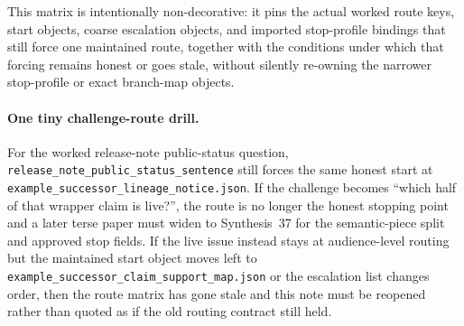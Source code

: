 \documentclass[11pt]{article}
\begin{document}
This matrix is intentionally non-decorative: it pins the actual worked route keys, start objects, coarse escalation objects, and imported stop-profile bindings that still force one maintained route, together with the conditions under which that forcing remains honest or goes stale, without silently re-owning the narrower stop-profile or exact branch-map objects.\cite{series:workedexample}

\paragraph{One tiny challenge-route drill.}
For the worked release-note public-status question, \nolinkurl{release_note_public_status_sentence} still forces the same honest start at \nolinkurl{example_successor_lineage_notice.json}. If the challenge becomes ``which half of that wrapper claim is live?'', the route is no longer the honest stopping point and a later terse paper must widen to Synthesis~37 for the semantic-piece split and approved stop fields. If the live issue instead stays at audience-level routing but the maintained start object moves left to \nolinkurl{example_successor_claim_support_map.json} or the escalation list changes order, then the route matrix has gone stale and this note must be reopened rather than quoted as if the old routing contract still held.\cite{series:workedexample}
\end{document}
